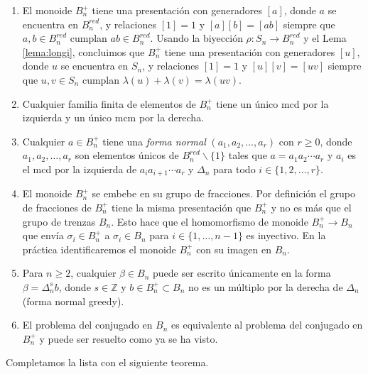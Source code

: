 \documentclass[12pt]{book}
\theoremstyle{definition}
\begin{document}
\begin{enumerate}[label=(\arabic*)]
\item El monoide $B_n^+$ tiene una presentación con generadores $[a]$, donde $a$ se encuentra en $B_n^{red}$, y relaciones $[1]=1$ y $[a][b]=[ab]$ siempre que $a,b\in B_n^{red}$ cumplan $ab\in B_n^{red}$. Usando la biyección $\rho: S_n\rightarrow B_n^{red}$ y el Lema \ref{lema:longi}, concluimos que $B_n^+$ tiene una presentación con generadores $[u]$, donde $u$ se encuentra en $S_n$, y relaciones $[1]=1$ y $[u][v]=[uv]$ siempre que $u,v\in S_n$ cumplan $\lambda(u)+\lambda(v)=\lambda(uv)$.
\item Cualquier familia finita de elementos de $B_n^+$ tiene un único mcd por la izquierda y un único mcm por la derecha.
\item Cualquier $a\in B_n^+$ tiene una \textit{forma normal} $(a_1,a_2,\ldots, a_r)$ con $r\geq 0$, donde $a_1,a_2,\ldots, a_r$ son elementos únicos de $B_n^{red}\backslash\{1\}$ tales que $a=a_1a_2\cdots a_r$ y $a_i$ es el mcd por la izquierda de $a_ia_{i+1}\cdots a_r$ y $\Delta_n$ para todo $i\in\{1,2,\ldots,r\}$.
\item El monoide $B_n^+$ se embebe en su grupo de fracciones. Por definición el grupo de fracciones de $B_n^+$ tiene la misma presentación que $B_n^+$ y no es más que el grupo de trenzas $B_n$. Esto hace que el homomorfismo de monoide $B_n^+\rightarrow B_n$ que envía $\sigma_i\in B_n^+$ a $\sigma_i\in B_n$ para $i\in\{1,\ldots, n-1\}$ es inyectivo. En la práctica identificaremos el monoide $B_n^+$ con su imagen en $B_n$.
\item Para $n\geq 2$, cualquier $\beta\in B_n$ puede ser escrito únicamente en la forma $\beta=\Delta_n^sb$, donde $s\in\mathbb{Z}$ y $b\in B_n^+\subset B_n$ no es un múltiplo por la derecha de $\Delta_n$ (forma normal greedy).
\item El problema del conjugado en $B_n$ es equivalente al problema del conjugado en $B_n^+$ y puede ser resuelto como ya se ha visto.
\end{enumerate}

Completamos la lista con el siguiente teorema.
\end{document}
